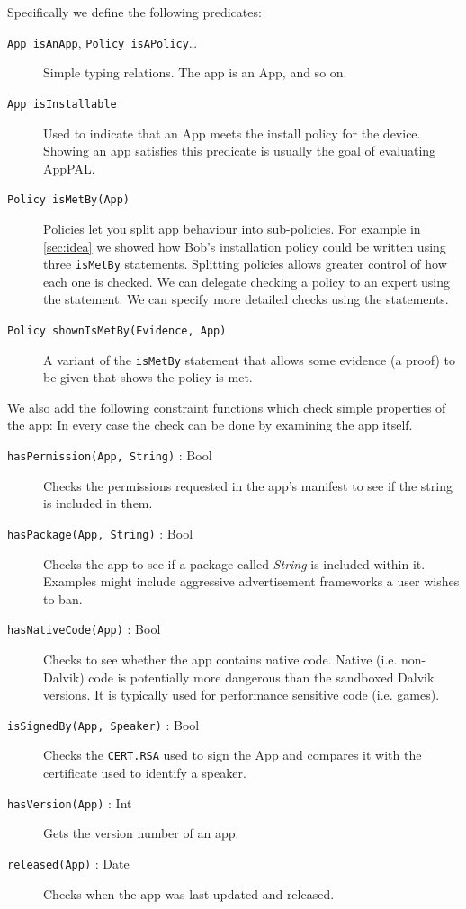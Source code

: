 \documentclass[a4paper]{scrartcl}
\begin{document}
Specifically we define the following predicates:
\begin{description}
  \item[\texttt{App isAnApp}, \texttt{Policy isAPolicy}\ldots] 
    Simple typing relations.  
    The app  is an App, and so on.
  
  \item[\texttt{App isInstallable}]
    Used to indicate that an App meets the install policy for the device.
    Showing an app satisfies this predicate is usually the goal of evaluating AppPAL.

  \item[\texttt{Policy isMetBy(App)}]
    Policies let you split app behaviour into sub-policies.
    For example in \autoref{sec:idea} we showed how Bob's installation policy could be written using three \texttt{isMetBy} statements.
    Splitting policies allows greater control of how each one is checked.
    We can delegate checking a policy to an expert using the  statement.
    We can specify more detailed checks using the  statements.

  \item[\texttt{Policy shownIsMetBy(Evidence, App)}]
    A variant of the \texttt{isMetBy} statement that allows some evidence (a proof) to be given that shows the policy is met.
\end{description}

We also add the following constraint functions which check simple properties of the app:
In every case the check can be done by examining the app itself.
\begin{description}
  \item[\texttt{hasPermission(App, String)} : Bool]
    Checks the permissions requested in the app's manifest to see if the string is included in them.

  \item[\texttt{hasPackage(App, String)} : Bool]
    Checks the app to see if a package called \emph{String} is included within it.
    Examples might include aggressive advertisement frameworks a user wishes to ban.

  \item[\texttt{hasNativeCode(App)} : Bool]
    Checks to see whether the app contains native code.
    Native (i.e. non-Dalvik) code is potentially more dangerous than the sandboxed Dalvik versions.
    It is typically used for performance sensitive code (i.e. games).

  \item[\texttt{isSignedBy(App, Speaker)} : Bool]
    Checks the \texttt{CERT.RSA} used to sign the App and compares it with the certificate used to identify a speaker.

  \item[\texttt{hasVersion(App)} : Int]
    Gets the version number of an app.

  \item[\texttt{released(App)} : Date]
    Checks when the app was last updated and released.
\end{description}
\end{document}
